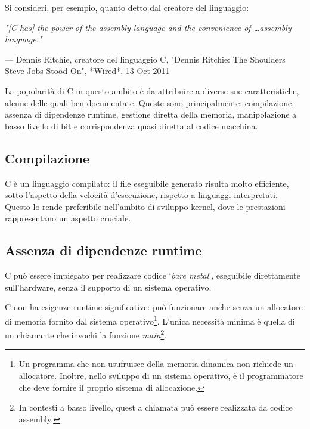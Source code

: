 Si consideri, per esempio, quanto detto dal creatore del linguaggio:
\begin{center}
    \begin{minipage}{0.9\textwidth}
        \vspace{0.5em}
        \itshape "[C has] the power of the assembly language and the convenience of \ldots assembly language."

        \hfill --- Dennis Ritchie, creatore del linguaggio C, "Dennis Ritchie: The Shoulders Steve Jobs Stood On", *Wired*, 13 Oct 2011
        \vspace{0.4em}
    \end{minipage}
\end{center}
\noindent La popolarità di C in questo ambito è da attribuire a
diverse sue caratteristiche, alcune delle quali ben documentate\cite{c-system-programming-why}. 
Queste sono principalmente: compilazione, assenza di dipendenze 
runtime, gestione diretta della memoria, manipolazione 
a basso livello di bit e corrispondenza quasi diretta al codice macchina.

\subsection*{Compilazione}
C è un linguaggio compilato: il file eseguibile generato risulta 
molto efficiente, sotto l'aspetto della velocità d'esecuzione, 
rispetto a linguaggi interpretati. Questo lo rende preferibile nell'ambito di sviluppo
kernel, dove le prestazioni rappresentano un aspetto cruciale.

\subsection*{Assenza di dipendenze runtime}
C può essere impiegato per realizzare codice 
`\textit{bare metal}', eseguibile direttamente sull'hardware, 
senza il supporto di un sistema operativo. 

C non ha esigenze runtime significative: può funzionare anche senza un allocatore di memoria fornito dal 
sistema operativo\footnote{Un programma che non usufruisce della memoria 
dinamica non richiede un allocatore. Inoltre, nello sviluppo di un sistema 
operativo, è il programmatore che deve fornire il proprio sistema di allocazione.}. L'unica 
necessità minima è quella di un chiamante che invochi la funzione \textit{main}\footnote{In contesti a basso livello, quest a chiamata 
 può essere realizzata da codice assembly.}.

